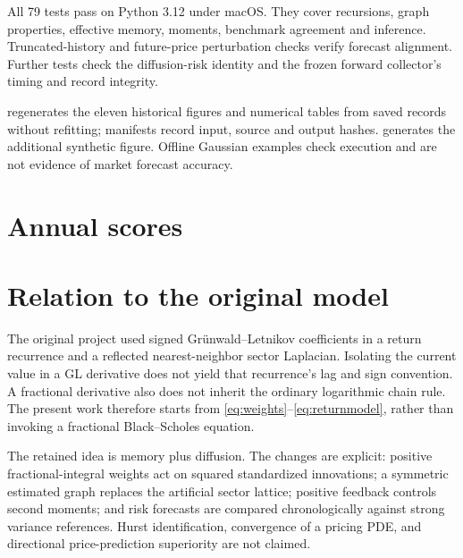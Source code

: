 \documentclass[12pt,a4paper]{article}
\begin{document}
All 79 tests pass on Python 3.12 under macOS. They cover recursions, graph
properties, effective memory, moments, benchmark agreement and inference.
Truncated-history and future-price perturbation checks verify forecast
alignment. Further tests check the diffusion-risk identity and the frozen
forward collector's timing and record integrity.

 regenerates the eleven historical figures
and numerical tables from saved records without refitting; manifests record
input, source and output hashes.  generates the
additional synthetic figure. Offline Gaussian examples check execution and
are not evidence of market forecast accuracy.

\clearpage
\section{Annual scores}
\begin{table}[htbp]
\centering\small\setlength{\tabcolsep}{5pt}

\caption{Annual mean normalized QLIKE for the fractional graph model. Levels
reflect both realized fluctuations and the origin's reference scale. Negative
scores are permissible; comparisons should use common-origin loss differences.}
\end{table}

\section{Relation to the original model}
The original project used signed Gr\"unwald--Letnikov coefficients in a return
recurrence and a reflected nearest-neighbor sector Laplacian. Isolating the
current value in a GL derivative does not yield that recurrence's lag and sign
convention. A fractional derivative also does not inherit the ordinary
logarithmic chain rule. The present work therefore starts from
\eqref{eq:weights}--\eqref{eq:returnmodel}, rather than invoking a fractional
Black--Scholes equation.

The retained idea is memory plus diffusion. The changes are explicit: positive
fractional-integral weights act on squared standardized innovations; a symmetric
estimated graph replaces the artificial sector lattice; positive feedback
controls second moments; and risk forecasts are compared chronologically against
strong variance references. Hurst identification, convergence of a pricing PDE,
and directional price-prediction superiority are not claimed.
\end{document}
